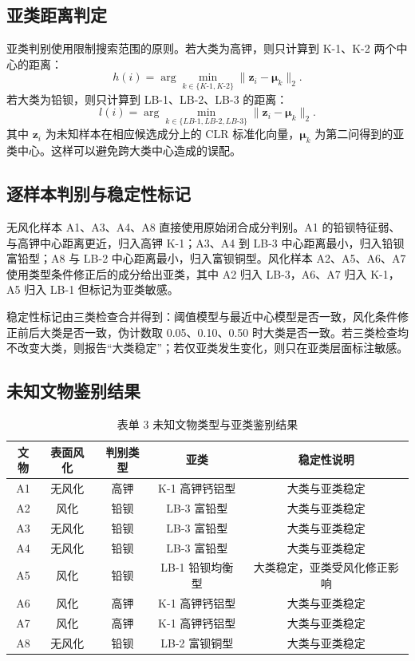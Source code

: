 \documentclass[UTF8,zihao=-4,a4paper,fontset=fandol]{ctexart}
\begin{document}
\subsection{亚类距离判定}

亚类判别使用限制搜索范围的原则。若大类为高钾，则只计算到 K-1、K-2 两个中心的距离：
\begin{equation}
  h(i)=\arg\min_{k\in\{K\text{-}1,K\text{-}2\}}\|\bm z_i-\bm \mu_k\|_2.
  \label{eq:subclass-k}
\end{equation}
若大类为铅钡，则只计算到 LB-1、LB-2、LB-3 的距离：
\begin{equation}
  l(i)=\arg\min_{k\in\{LB\text{-}1,LB\text{-}2,LB\text{-}3\}}\|\bm z_i-\bm \mu_k\|_2.
  \label{eq:subclass-lb}
\end{equation}
其中 $\bm z_i$ 为未知样本在相应候选成分上的 CLR 标准化向量，$\bm \mu_k$ 为第二问得到的亚类中心。这样可以避免跨大类中心造成的误配。

\subsection{逐样本判别与稳定性标记}

无风化样本 A1、A3、A4、A8 直接使用原始闭合成分判别。A1 的铅钡特征弱、与高钾中心距离更近，归入高钾 K-1；A3、A4 到 LB-3 中心距离最小，归入铅钡富铅型；A8 与 LB-2 中心距离最小，归入富钡铜型。风化样本 A2、A5、A6、A7 使用类型条件修正后的成分给出亚类，其中 A2 归入 LB-3，A6、A7 归入 K-1，A5 归入 LB-1 但标记为亚类敏感。

稳定性标记由三类检查合并得到：阈值模型与最近中心模型是否一致，风化条件修正前后大类是否一致，伪计数取 0.05、0.10、0.50 时大类是否一致。若三类检查均不改变大类，则报告“大类稳定”；若仅亚类发生变化，则只在亚类层面标注敏感。

\subsection{未知文物鉴别结果}

\begin{table}[H]
  \centering
  \caption{表单 3 未知文物类型与亚类鉴别结果}
  \label{tab:q3-final}
  \begin{tabular}{ccccc}
    \toprule
    文物 & 表面风化 & 判别类型 & 亚类 & 稳定性说明 \\
    \midrule
    A1 & 无风化 & 高钾 & K-1 高钾钙铝型 & 大类与亚类稳定 \\
    A2 & 风化 & 铅钡 & LB-3 富铅型 & 大类与亚类稳定 \\
    A3 & 无风化 & 铅钡 & LB-3 富铅型 & 大类与亚类稳定 \\
    A4 & 无风化 & 铅钡 & LB-3 富铅型 & 大类与亚类稳定 \\
    A5 & 风化 & 铅钡 & LB-1 铅钡均衡型 & 大类稳定，亚类受风化修正影响 \\
    A6 & 风化 & 高钾 & K-1 高钾钙铝型 & 大类与亚类稳定 \\
    A7 & 风化 & 高钾 & K-1 高钾钙铝型 & 大类与亚类稳定 \\
    A8 & 无风化 & 铅钡 & LB-2 富钡铜型 & 大类与亚类稳定 \\
    \bottomrule
  \end{tabular}
\end{table}
\end{document}
